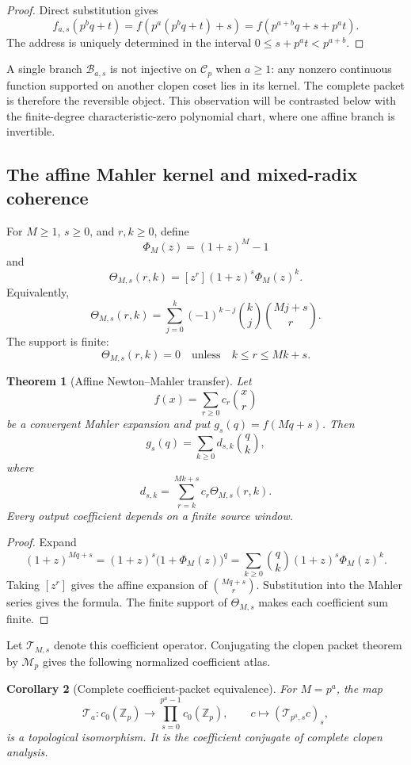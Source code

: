 \documentclass[11pt]{article}
\newtheorem{theorem}{Theorem}[section]
\newtheorem{corollary}[theorem]{Corollary}
\theoremstyle{definition}
\theoremstyle{remark}
\begin{document}
\begin{proof}
Direct substitution gives
\[
 f_{a,s}(p^bq+t)
 =f(p^a(p^bq+t)+s)
 =f(p^{a+b}q+s+p^a t).
\]
The address is uniquely determined in the interval \(0\leq s+p^a t<p^{a+b}\).
\end{proof}

A single branch \(\mathcal B_{a,s}\) is not injective on \(\mathcal C_p\) when \(a\geq1\): any nonzero continuous function supported on another clopen coset lies in its kernel.  The complete packet is therefore the reversible object.  This observation will be contrasted below with the finite-degree characteristic-zero polynomial chart, where one affine branch is invertible.

\subsection{The affine Mahler kernel and mixed-radix coherence}
\label{subsec:block08-affine-kernel}

For \(M\geq1\), \(s\geq0\), and \(r,k\geq0\), define
\[
 \Phi_M(z)=(1+z)^M-1
\]
and
\[
 \boxed{
 \Theta_{M,s}(r,k)
 =[z^r](1+z)^s\Phi_M(z)^k.}
\]
Equivalently,
\[
 \boxed{
 \Theta_{M,s}(r,k)
 =\sum_{j=0}^{k}(-1)^{k-j}\binom kj\binom{Mj+s}{r}.}
\]
The support is finite:
\[
 \Theta_{M,s}(r,k)=0
 \quad\text{unless}\quad
 k\leq r\leq Mk+s.
\]

\begin{theorem}[Affine Newton--Mahler transfer]
\label{thm:block08-affine-transfer}
Let
\[
 f(x)=\sum_{r\geq0}c_r\binom xr
\]
be a convergent Mahler expansion and put \(g_s(q)=f(Mq+s)\).  Then
\[
 g_s(q)=\sum_{k\geq0}d_{s,k}\binom qk,
\]
where
\[
 \boxed{
 d_{s,k}
 =\sum_{r=k}^{Mk+s}c_r\Theta_{M,s}(r,k).}
\]
Every output coefficient depends on a finite source window.
\end{theorem}

\begin{proof}
Expand
\[
 (1+z)^{Mq+s}
 =(1+z)^s\bigl(1+\Phi_M(z)\bigr)^q
 =\sum_{k\geq0}\binom qk(1+z)^s\Phi_M(z)^k.
\]
Taking \([z^r]\) gives the affine expansion of \(\binom{Mq+s}{r}\).  Substitution into the Mahler series gives the formula.  The finite support of \(\Theta_{M,s}\) makes each coefficient sum finite.
\end{proof}

Let \(\mathcal T_{M,s}\) denote this coefficient operator.  Conjugating the clopen packet theorem by \(\mathcal M_p\) gives the following normalized coefficient atlas.

\begin{corollary}[Complete coefficient-packet equivalence]
\label{cor:block08-coefficient-packet}
For \(M=p^a\), the map
\[
 \mathcal T_a:c_0(\mathbb Z_p)
 \longrightarrow
 \prod_{s=0}^{p^a-1}c_0(\mathbb Z_p),
 \qquad
 c\longmapsto(\mathcal T_{p^a,s}c)_s,
\]
is a topological isomorphism.  It is the coefficient conjugate of complete clopen analysis.
\end{corollary}
\end{document}
